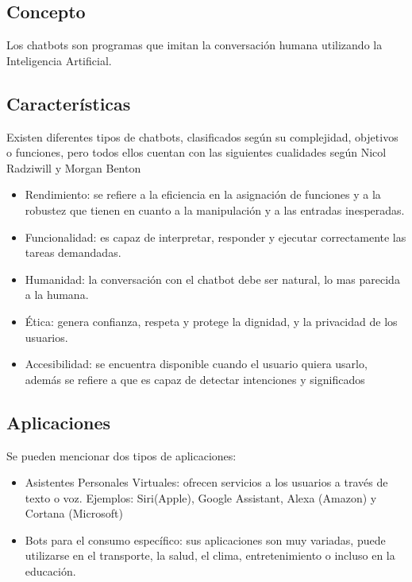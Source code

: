 








\subsection{Concepto}
Los chatbots son programas que imitan la conversación humana utilizando la Inteligencia Artificial.\cite{UniversityRelatedFAQS}
\subsection{Características}
Existen diferentes tipos de chatbots, clasificados según su complejidad, objetivos o funciones, pero todos ellos cuentan con las siguientes cualidades según Nicol Radziwill y Morgan Benton \cite{evaluating_quality}
\begin{itemize}
    \item Rendimiento: se refiere a la eficiencia en la asignación de funciones y a la robustez que tienen en cuanto a la manipulación y a las entradas inesperadas.
    \item Funcionalidad: es capaz de interpretar, responder y ejecutar  correctamente las tareas demandadas.
    \item Humanidad: la conversación con el chatbot debe ser natural, lo mas parecida a la humana.
    \item Ética: genera confianza, respeta y protege la dignidad, y la privacidad de los usuarios.
    \item Accesibilidad: se encuentra disponible cuando el usuario quiera usarlo, además se refiere a que es capaz de detectar intenciones y significados
\end{itemize}

\subsection{Aplicaciones}
Se pueden mencionar dos tipos de aplicaciones:
\begin{itemize}
    \item Asistentes Personales Virtuales: ofrecen servicios a los usuarios a través de texto o voz. Ejemplos: Siri(Apple), Google Assistant, Alexa (Amazon) y Cortana (Microsoft)
    \item Bots para el consumo específico: sus aplicaciones son muy variadas, puede utilizarse en el transporte, la salud, el clima, entretenimiento o incluso en la educación.
\end{itemize}
